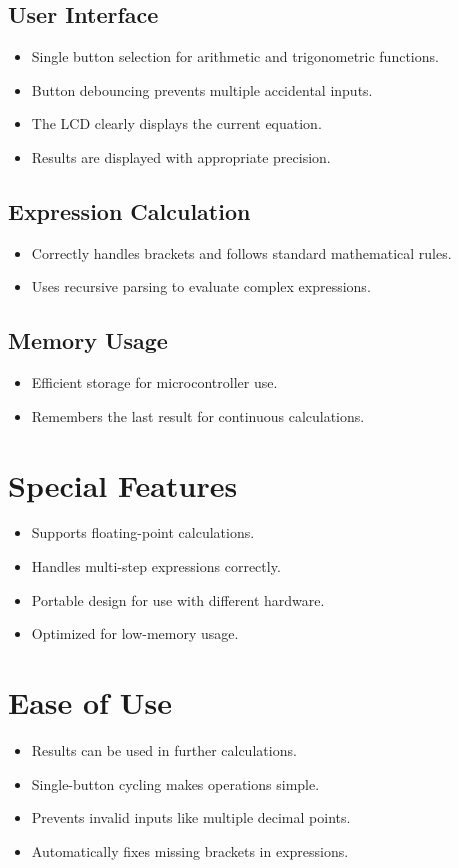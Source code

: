 \documentclass[journal]{IEEEtran}
\begin{document}
\subsection{User Interface}
\begin{itemize}
    \item Single button selection for arithmetic and trigonometric functions.
    \item Button debouncing prevents multiple accidental inputs.
    \item The LCD clearly displays the current equation.
    \item Results are displayed with appropriate precision.
\end{itemize}

\subsection{Expression Calculation}
\begin{itemize}
    \item Correctly handles brackets and follows standard mathematical rules.
    \item Uses recursive parsing to evaluate complex expressions.
\end{itemize}

\subsection{Memory Usage}
\begin{itemize}
    \item Efficient storage for microcontroller use.
    \item Remembers the last result for continuous calculations.
\end{itemize}

\section{Special Features}
\begin{itemize}
    \item Supports floating-point calculations.
    \item Handles multi-step expressions correctly.
    \item Portable design for use with different hardware.
    \item Optimized for low-memory usage.
\end{itemize}

\section{Ease of Use}
\begin{itemize}
    \item Results can be used in further calculations.
    \item Single-button cycling makes operations simple.
    \item Prevents invalid inputs like multiple decimal points.
    \item Automatically fixes missing brackets in expressions.
\end{itemize}
\end{document}
